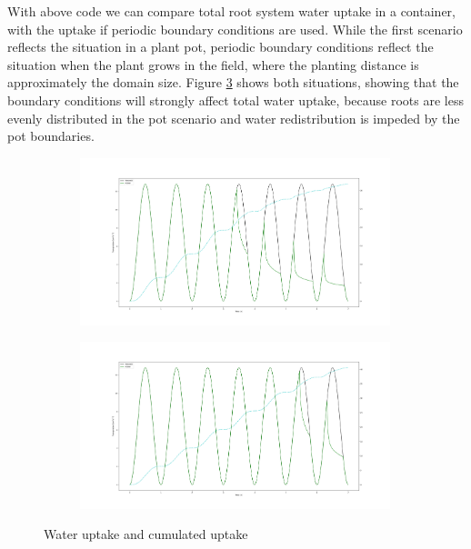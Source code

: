 With above code we can compare total root system water uptake in a container, with the uptake if periodic boundary conditions are used. While the first scenario reflects the situation in a plant pot, periodic boundary conditions reflect the situation when the plant grows in the field, where the planting distance is approximately the domain size. Figure \ref{fig:uptake} shows both situations, showing that the boundary conditions will strongly affect total water uptake, because roots are less evenly distributed in the pot scenario and water redistribution is impeded by the pot boundaries.

\begin{figure}
\begin{subfigure}[c]{1\textwidth} 
\includegraphics[width=0.99\textwidth]{Figure6c.png}
 \label{fig:uptake_confined}
\end{subfigure}
\begin{subfigure}[c]{1\textwidth}
\includegraphics[width=0.99\textwidth]{Figure6c_periodic.png}
 \label{fig:uptake_peridodic}
\end{subfigure}
\caption{Water uptake and cumulated uptake} \label{fig:uptake}
\end{figure}



